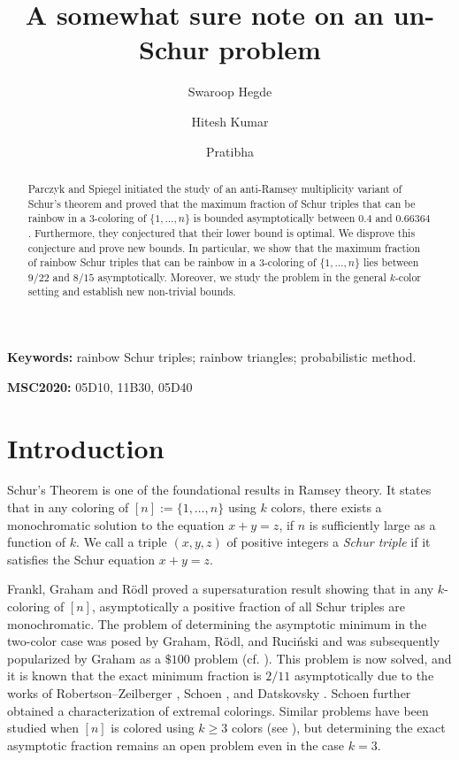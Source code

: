 \documentclass[11pt]{article}
\title{\textbf{A somewhat sure note on an un-Schur problem}}
\author{Swaroop Hegde \and Hitesh Kumar \and Pratibha}
\date{}
\theoremstyle{plain}
\numberwithin{equation}{section}
\begin{document}
\maketitle
\begin{abstract} 
Parczyk and Spiegel initiated the study of an anti-Ramsey multiplicity variant of Schur's theorem and proved that the maximum fraction of Schur triples that can be rainbow in a $3$-coloring of $\{ 1, \dots ,n \}$ is bounded asymptotically between $0.4$ and $0.66364$. Furthermore, they conjectured that their lower bound is optimal. We disprove this conjecture and prove new bounds. In particular, we show that the maximum fraction of rainbow Schur triples that can be rainbow in a $3$-coloring of $\{ 1, \dots ,n \}$ lies between $9/22$ and $8/15$ asymptotically. Moreover, we study the problem in the general $k$-color setting and establish new non-trivial bounds. 
\end{abstract}

\noindent
\textbf{Keywords:} rainbow Schur triples; rainbow triangles; probabilistic method.

\noindent
\textbf{MSC2020:} 05D10, 11B30, 05D40

\section{Introduction}

Schur's Theorem is one of the foundational results in Ramsey theory. It states that in any coloring of $[n]:=\{ 1, \ldots, n\}$ using $k$ colors, there exists a monochromatic solution to the equation $x+y=z$, if $n$ is sufficiently large as a function of $k$. We call a triple $(x,y,z)$ of positive integers a \emph{Schur triple} if it satisfies the Schur equation $x+y=z$. 

Frankl, Graham and R\"{o}dl \cite{FGR_1988} proved a supersaturation result showing that in any $k$-coloring of $[n]$, asymptotically a positive fraction of all Schur triples are monochromatic. The problem of determining the asymptotic minimum in the two-color case was posed by Graham, R\"{o}dl, and Ruci\'{n}ski \cite{Graham_Rodl_Rucinski_1996} and was subsequently popularized by Graham as a $\$100$ problem (cf. \cite{Robertson_Zeilberger_1998}). This problem is now solved, and it is known that the exact minimum fraction is $2/11$ asymptotically due to the works of Robertson--Zeilberger \cite{Robertson_Zeilberger_1998}, Schoen \cite{Schoen_1999}, and Datskovsky \cite{Datskovsky_2003}. Schoen \cite{Schoen_1999} further obtained a characterization of extremal colorings. Similar problems have been studied when $[n]$ is colored using $k\ge 3$ colors (see \cite{DeLoera_Ventura_Wang_Wesley_2025, Mao_Robertson_Wang_Yang_Yang_2026, Thanatipanonda_2009}), but determining the exact asymptotic fraction remains an open problem even in the case $k=3$.
\end{document}
